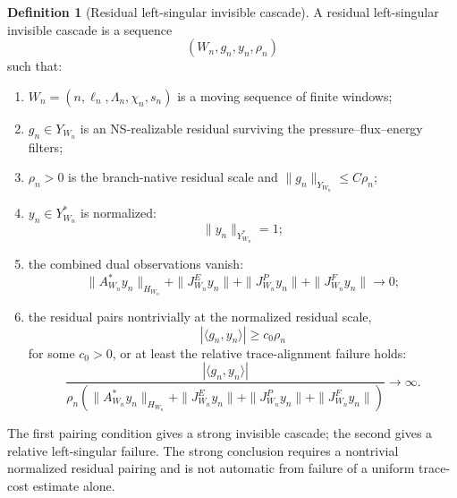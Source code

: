 \documentclass[11pt]{article}
\numberwithin{equation}{section}
\theoremstyle{plain}
\theoremstyle{definition}
\newtheorem{definition}[theorem]{Definition}
\theoremstyle{remark}
\begin{document}
\begin{definition}[Residual left-singular invisible cascade]
\label{def:residual-left-singular-cascade-clean}
A residual left-singular invisible cascade is a sequence
\[
        (W_n,g_n,y_n,\rho_n)
\]
such that:

\begin{enumerate}
\item \(W_n=(n,\ell_n,\Lambda_n,\chi_n,s_n)\) is a moving sequence of finite
windows;

\item \(g_n\in Y_{W_n}\) is an NS-realizable residual surviving the
pressure--flux--energy filters;

\item \(\rho_n>0\) is the branch-native residual scale and
\(\|g_n\|_{Y_{W_n}}\le C\rho_n\);

\item \(y_n\in Y_{W_n}^*\) is normalized:
\[
        \|y_n\|_{Y_{W_n}^*}=1;
\]

\item the combined dual observations vanish:
\[
        \|A_{W_n}^*y_n\|_{H_{W_n}}
        +
        \|J^E_{W_n}y_n\|
        +
        \|J^P_{W_n}y_n\|
        +
        \|J^F_{W_n}y_n\|
        \to0;
\]

\item the residual pairs nontrivially at the normalized residual scale,
\begin{equation}
        |\langle g_n,y_n\rangle|
        \ge
        c_0\rho_n
        \label{eq:strong-left-singular-pairing}
\end{equation}
for some \(c_0>0\), or at least the relative trace-alignment failure holds:
\begin{equation}
        \frac{|\langle g_n,y_n\rangle|}
        {\rho_n\left(
            \|A_{W_n}^*y_n\|_{H_{W_n}}
            +\|J^E_{W_n}y_n\|
            +\|J^P_{W_n}y_n\|
            +\|J^F_{W_n}y_n\|
        \right)}
        \longrightarrow\infty.
        \label{eq:relative-left-singular-failure}
\end{equation}
\end{enumerate}
The first pairing condition gives a strong invisible cascade; the second gives
a relative left-singular failure.  The strong conclusion requires a nontrivial
normalized residual pairing and is not automatic from failure of a uniform
trace-cost estimate alone.
\end{definition}
\end{document}
